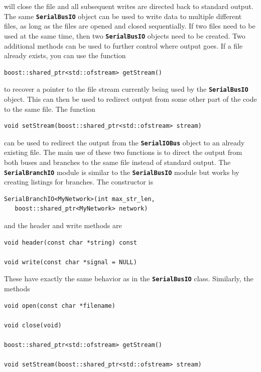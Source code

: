 will close the file and all subsequent writes are directed back to standard output. The same \texttt{\textbf{SerialBusIO}} object can be used to write data to multiple different files, as long as the files are opened and closed sequentially. If two files need to be used at the same time, then two \texttt{\textbf{SerialBusIO}} objects need to be created. Two additional methods can be used to further control where output goes. If a file already exists, you can use the function

{
\color{red}
\begin{Verbatim}[fontseries=b]
boost::shared_ptr<std::ofstream> getStream()
\end{Verbatim}
}

to recover a pointer to the file stream currently being used by the \texttt{\textbf{SerialBusIO}} object. This can then be used to redirect output from some other part of the code to the same file. The function

{
\color{red}
\begin{Verbatim}[fontseries=b]
void setStream(boost::shared_ptr<std::ofstream> stream)
\end{Verbatim}
}

can be used to redirect the output from the \texttt{\textbf{SerialIOBus}} object to an already existing file. The main use of these two functions is to direct the output from both buses and branches to the same file instead of standard output.
The \texttt{\textbf{SerialBranchIO}} module is similar to the \texttt{\textbf{SerialBusIO}} module but works by creating listings for branches. The constructor is

{
\color{red}
\begin{Verbatim}[fontseries=b]
SerialBranchIO<MyNetwork>(int max_str_len,
   boost::shared_ptr<MyNetwork> network)
\end{Verbatim}
}

and the header and write methods are

{
\color{red}
\begin{Verbatim}[fontseries=b]
void header(const char *string) const

void write(const char *signal = NULL)
\end{Verbatim}
}

These have exactly the same behavior as in the \texttt{\textbf{SerialBusIO}} class. Similarly, the methods

{
\color{red}
\begin{Verbatim}[fontseries=b]
void open(const char *filename)

void close(void)

boost::shared_ptr<std::ofstream> getStream()

void setStream(boost::shared_ptr<std::ofstream> stream)
\end{Verbatim}
}


